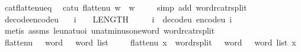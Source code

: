 \begin{isabellebody}
\endisatagproof
{\isafoldproof}%
%
\isadelimproof
\isanewline
%
\endisadelimproof
\isanewline
{}\isamarkupfalse%
\ cat{\isacharunderscore}{\kern0pt}flatten{\isacharunderscore}{\kern0pt}u{}{}{\isacharunderscore}{\kern0pt}eq{\isacharcolon}{\kern0pt}\isanewline
\ \ {\isachardoublequoteopen}cat{\isacharunderscore}{\kern0pt}u{}{}\ {\isacharparenleft}{\kern0pt}flatten{\isacharunderscore}{\kern0pt}u{}{}\ w{\isacharparenright}{\kern0pt}\ {\isacharequal}{\kern0pt}\ w{\isachardoublequoteclose}\ \isanewline
%
\isadelimproof
\ \ %
\endisadelimproof
%
\isatagproof
{}\isamarkupfalse%
\ {\isacharparenleft}{\kern0pt}simp\ add{\isacharcolon}{\kern0pt}\ word{\isacharunderscore}{\kern0pt}rcat{\isacharunderscore}{\kern0pt}rsplit{\isacharparenright}{\kern0pt}%
\endisatagproof
{\isafoldproof}%
%
\isadelimproof
\isanewline
%
\endisadelimproof
\isanewline
{}\isamarkupfalse%
\ decode{\isacharunderscore}{\kern0pt}encode{\isacharunderscore}{\kern0pt}u{}{}{\isacharcolon}{\kern0pt}\isanewline
\ \ \ {\isachardoublequoteopen}i\ {\isasymle}\ {}\ {\isacharcircum}{\kern0pt}\ LENGTH{\isacharparenleft}{\kern0pt}{}{}{\isacharparenright}{\kern0pt}\ {\isacharminus}{\kern0pt}\ {}{\isachardoublequoteclose}\isanewline
\ \ \ {\isachardoublequoteopen}i\ {\isacharequal}{\kern0pt}\ decode{\isacharunderscore}{\kern0pt}u{}{}\ {\isacharparenleft}{\kern0pt}encode{\isacharunderscore}{\kern0pt}u{}{}\ i{\isacharparenright}{\kern0pt}{\isachardoublequoteclose}\ \isanewline
%
\isadelimproof
\ \ %
\endisadelimproof
%
\isatagproof
{}\isamarkupfalse%
\ {\isacharparenleft}{\kern0pt}metis\ assms\ le{\isacharunderscore}{\kern0pt}unat{\isacharunderscore}{\kern0pt}uoi\ unat{\isacharunderscore}{\kern0pt}minus{\isacharunderscore}{\kern0pt}one{\isacharunderscore}{\kern0pt}word\ word{\isacharunderscore}{\kern0pt}rcat{\isacharunderscore}{\kern0pt}rsplit{\isacharparenright}{\kern0pt}%
\endisatagproof
{\isafoldproof}%
%
\isadelimproof
\isanewline
%
\endisadelimproof
\ \ \isanewline
\isanewline
{}\isamarkupfalse%
\ flatten{\isacharunderscore}{\kern0pt}u{}{}\ {\isacharcolon}{\kern0pt}{\isacharcolon}{\kern0pt}\ {\isachardoublequoteopen}{}{}\ word\ {\isasymRightarrow}\ {}\ word\ list{\isachardoublequoteclose}\isanewline
\ \ \isanewline
\ \ {\isachardoublequoteopen}flatten{\isacharunderscore}{\kern0pt}u{}{}\ x\ {\isasymequiv}\ {\isacharparenleft}{\kern0pt}word{\isacharunderscore}{\kern0pt}rsplit\ {\isacharcolon}{\kern0pt}{\isacharcolon}{\kern0pt}\ {}{}\ word\ {\isasymRightarrow}\ {}\ word\ list{\isacharparenright}{\kern0pt}\ x{\isachardoublequoteclose}\isanewline

\end{isabellebody}
